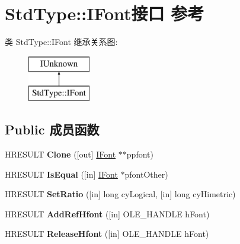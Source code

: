 \hypertarget{interface_std_type_1_1_i_font}{}\section{Std\+Type\+:\+:I\+Font接口 参考}
\label{interface_std_type_1_1_i_font}
类 Std\+Type\+:\+:I\+Font 继承关系图\+:\begin{figure}[H]
\begin{center}
\leavevmode
\includegraphics[height=2.000000cm]{interface_std_type_1_1_i_font}
\end{center}
\end{figure}
\subsection*{Public 成员函数}
\begin{DoxyCompactItemize}
\item 
\mbox{\label{interface_std_type_1_1_i_font_a68018ea293d8f9126715317cd3b6397e}} 
H\+R\+E\+S\+U\+LT {\bfseries Clone} (\mbox{[}out\mbox{]} \hyperlink{interface_std_type_1_1_i_font}{I\+Font} $\ast$$\ast$ppfont)
\item 
\mbox{\label{interface_std_type_1_1_i_font_a5e3d097bb2ff1532ad1c1449a9f03126}} 
H\+R\+E\+S\+U\+LT {\bfseries Is\+Equal} (\mbox{[}in\mbox{]} \hyperlink{interface_std_type_1_1_i_font}{I\+Font} $\ast$pfont\+Other)
\item 
\mbox{\label{interface_std_type_1_1_i_font_aa592682d89ce85848a670c83c54fda6c}} 
H\+R\+E\+S\+U\+LT {\bfseries Set\+Ratio} (\mbox{[}in\mbox{]} long cy\+Logical, \mbox{[}in\mbox{]} long cy\+Himetric)
\item 
\mbox{\label{interface_std_type_1_1_i_font_ab8a616e946cae1a9ef3cae3a2c15b1c4}} 
H\+R\+E\+S\+U\+LT {\bfseries Add\+Ref\+Hfont} (\mbox{[}in\mbox{]} O\+L\+E\+\_\+\+H\+A\+N\+D\+LE h\+Font)
\item 
\mbox{\label{interface_std_type_1_1_i_font_aeb70bd0bf8b434fa5033f920fb958678}} 
H\+R\+E\+S\+U\+LT {\bfseries Release\+Hfont} (\mbox{[}in\mbox{]} O\+L\+E\+\_\+\+H\+A\+N\+D\+LE h\+Font)
\end{DoxyCompactItemize}
